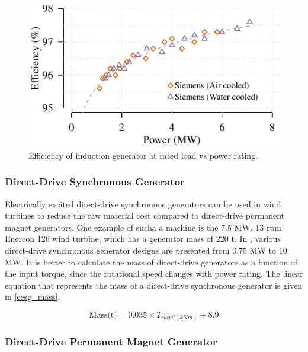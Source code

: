 \documentclass{article}\usepackage{graphicx, color}
\makeatletter
\def\maxwidth{ %
  \ifdim\Gin@nat@width>\linewidth
    \linewidth
  \else
    \Gin@nat@width
  \fi
}
\newenvironment{knitrout}{}{} %
\makeatother
\begin{document}
\begin{knitrout}
\color{fgcolor}\begin{figure}[]

\includegraphics[width=\maxwidth]{figure/induction_generator_efficiency} \caption[Efficiency of induction generator at rated load vs power rating]{Efficiency of induction generator at rated load vs power rating.\label{fig:induction_generator_efficiency}}
\end{figure}


\end{knitrout}



\subsubsection{Direct-Drive Synchronous Generator}

Electrically excited direct-drive synchronous generators can be used in wind turbines to reduce the raw material cost compared to direct-drive permanent magnet generators. One example of sucha a machine is the 7.5 MW, 13 rpm Enercon 126 wind turbine, which has a generator mass of 220 t.
In \cite{upwind2011}, various direct-drive synchronous generator designs are presented from 0.75 MW to 10 MW. It is better to calculate the mass of direct-drive generators as a function of the input torque, since the rotational speed changes with power rating. The linear equation that represents the mass of a direct-drive synchronous generator is given in \autoref{eesg_mass}.

\begin{equation}
  \text{Mass(t)} = 0.035 \times {T_{rated(kNm)}} + 8.9
  \label{eesg_mass}
\end{equation}

\subsubsection{Direct-Drive Permanent Magnet Generator}
\end{document}
